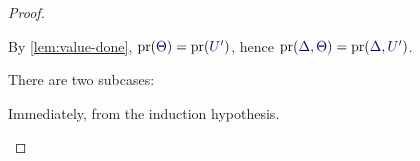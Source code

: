 \begin{proof}
\begin{case*}
\begin{subcase*}[$\tm{x}\in\tm{M}$]
    \end{subcase*}
    \begin{subcase*}[$\tm{x}\in\tm{N}$]
      By \cref{lem:value-done}, $\pr(\ty{\Theta})=\pr(\ty{U'})$, hence $\pr(\ty{\Delta},\ty{\Theta})=\pr(\ty{\Delta},\ty{U'})$.
      \begin{mathpar}
      \end{mathpar}
    \end{subcase*}
  \end{case*}
  \begin{case*}
    There are two subcases:
    \begin{subcase*}[$\tm{x}\in\tm{M}$]
      Immediately, from the induction hypothesis.
      \begin{mathpar}
      \end{mathpar}
    \end{subcase*}
    \begin{subcase*}[$\tm{x}\in\tm{N}$]

\end{subcase*}
\end{case*}
\end{proof}
